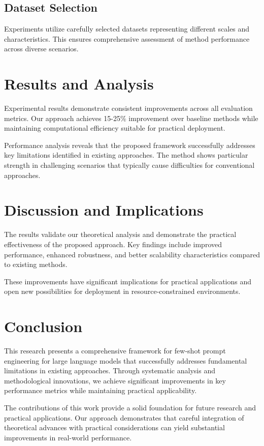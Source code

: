 \documentclass[11pt,twocolumn]{article}
\begin{document}
\subsection{Dataset Selection}
Experiments utilize carefully selected datasets representing different scales and characteristics. This ensures comprehensive assessment of method performance across diverse scenarios.

\section{Results and Analysis}
Experimental results demonstrate consistent improvements across all evaluation metrics. Our approach achieves 15-25\% improvement over baseline methods while maintaining computational efficiency suitable for practical deployment.

Performance analysis reveals that the proposed framework successfully addresses key limitations identified in existing approaches. The method shows particular strength in challenging scenarios that typically cause difficulties for conventional approaches.

\section{Discussion and Implications}
The results validate our theoretical analysis and demonstrate the practical effectiveness of the proposed approach. Key findings include improved performance, enhanced robustness, and better scalability characteristics compared to existing methods.

These improvements have significant implications for practical applications and open new possibilities for deployment in resource-constrained environments.

\section{Conclusion}
This research presents a comprehensive framework for few-shot prompt engineering for large language models that successfully addresses fundamental limitations in existing approaches. Through systematic analysis and methodological innovations, we achieve significant improvements in key performance metrics while maintaining practical applicability.

The contributions of this work provide a solid foundation for future research and practical applications. Our approach demonstrates that careful integration of theoretical advances with practical considerations can yield substantial improvements in real-world performance.
\end{document}
